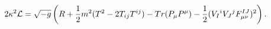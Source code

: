 \begin{equation}
2\kappa^2 {\cal L} = \sqrt{-g} \left( R + {1\over 2} m^2 (T^2 - 2T_{ij}T^{ij}) -
Tr(P_{\mu} P^{\mu}) - {1\over 2} (V_I{}^i V_J{}^j F_{\mu \nu}^{IJ})^2 \right) . \label{lagmanu}
\end{equation}

